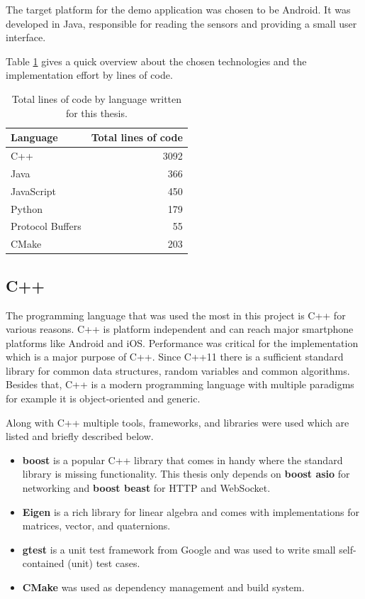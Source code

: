 The target platform for the demo application was chosen to be Android. It was developed in Java, responsible for reading the sensors and providing a small user interface.

Table \ref{tbl:code_lines} gives a quick overview about the chosen technologies and the implementation effort by lines of code.

\begin{table}[h]
    \centering
    \begin{tabular}{ | l | r | }
    \hline
    \textbf{Language} & \textbf{Total lines of code} \\ \hline
    C++               & 3092 \\ \hline
    Java              &  366 \\ \hline
    JavaScript        &  450 \\ \hline
    Python            &  179 \\ \hline
    Protocol Buffers  &   55 \\ \hline
    CMake             &  203 \\ \hline
    \end{tabular}
    \caption{Total lines of code by language written for this thesis.}
    \label{tbl:code_lines}
\end{table}

\subsection{C++}

The programming language that was used the most in this project is C++ for various reasons. C++ is platform independent and can reach major smartphone platforms like Android and iOS. Performance was critical for the implementation which is a major purpose of C++. Since C++11 there is a sufficient standard library for common data structures, random variables and common algorithms. Besides that, C++ is a modern programming language with multiple paradigms for example it is object-oriented and generic.

Along with C++ multiple tools, frameworks, and libraries were used which are listed and briefly described below.

\begin{itemize}
  \item \textbf{boost} is a popular C++ library that comes in handy where the standard library is missing functionality. This thesis only depends on \textbf{boost asio} for networking and \textbf{boost beast} for HTTP and WebSocket.
  \item \textbf{Eigen} is a rich library for linear algebra and comes with implementations for matrices, vector, and quaternions.
  \item \textbf{gtest} is a unit test framework from Google and was used to write small self-contained (unit) test cases.
  \item \textbf{CMake} was used as dependency management and build system.
\end{itemize}

